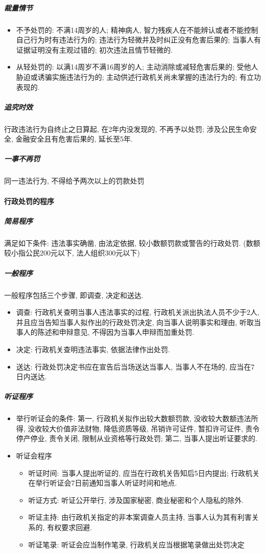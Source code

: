 \subparagraph{裁量情节}

\begin{itemize}
	\item 不予处罚的: 不满14周岁的人; 精神病人, 智力残疾人在不能辨认或者不能控制自己行为时有违法行为的; 违法行为轻微并及时纠正没有危害后果的; 当事人有证据证明没有主观过错的; 初次违法且情节轻微的.
	\item 从轻处罚的: 以满14周岁不满16周岁的人; 主动消除或减轻危害后果的; 受他人胁迫或诱骗实施违法行为的; 主动供述行政机关尚未掌握的违法行为的; 有立功表现的.
\end{itemize}

\subparagraph{追究时效} 行政违法行为自终止之日算起, 在2年内没发现的, 不再予以处罚; 涉及公民生命安全, 金融安全且有危害后果的, 延长至5年.

\subparagraph{一事不再罚} 同一违法行为, 不得给予两次以上的罚款处罚

\paragraph{行政处罚的程序}

\subparagraph{简易程序} 满足如下条件: 违法事实确凿, 由法定依据, 较小数额罚款或警告的行政处罚. (数额较小指公民200元以下, 法人组织300元以下)

\subparagraph{一般程序} 一般程序包括三个步骤, 即调查, 决定和送达.

\begin{itemize}
	\item 调查: 行政机关查明当事人违法事实的过程, 行政机关派出执法人员不少于2人, 并且应当告知当事人拟作出的行政处罚决定, 向当事人说明事实和理由, 听取当事人的陈述和申辩意见, 不得因为当事人申辩而加重处罚.
	\item 决定: 行政机关查明违法事实, 依据法律作出处罚.
	\item 送达: 行政处罚决定书应在宣告后当场送达当事人, 当事人不在场的, 应当在7日内送达.
\end{itemize}

\subparagraph{听证程序}

\begin{itemize}
	\item 举行听证会的条件: 第一, 行政机关拟作出较大数额罚款, 没收较大数额违法所得, 没收较大价值非法财物, 降低资质等级, 吊销许可证件, 暂扣许可证件, 责令停产停业, 责令关闭, 限制从业资格等行政处罚; 第二, 当事人提出听证要求的.
	\item 听证会程序
	      \begin{itemize}
		      \item 听证时间: 当事人提出听证的, 应当在行政机关告知后5日内提出; 行政机关在举行听证会7日前通知当事人听证时间和地点.
		      \item 听证方式: 听证公开举行, 涉及国家秘密, 商业秘密和个人隐私的除外.
		      \item 听证主持: 由行政机关指定的非本案调查人员主持, 当事人认为其有利害关系的, 有权要求回避.
		      \item 听证笔录: 听证会应当制作笔录, 行政机关应当根据笔录做出处罚决定
	      \end{itemize}
\end{itemize}

